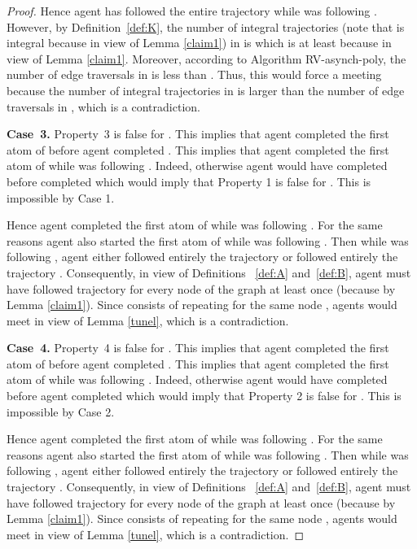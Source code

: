 \documentclass [11pt] {article}
\begin{document}
\begin{proof}
Hence agent  has followed the entire trajectory  while  was following . 
However, by Definition~\ref{def:K}, the number of integral trajectories  (note that  is integral because  in view of Lemma \ref{claim1}) in  is  which is at least  because  in view of Lemma \ref{claim1}. Moreover, according to Algorithm RV-asynch-poly, the number of {edge traversals} in  is less than . Thus, this would force a meeting because the number of integral trajectories  in  is larger than the number of {edge traversals} in , which is a contradiction.  



{\bf Case~3.} Property~3 is false for . This implies that agent  completed the first atom of   before agent  completed . This implies that agent  completed the first atom of   while  was following . Indeed, otherwise agent  would have completed  before  completed  which would imply that Property 1 is false for . This
is impossible by Case 1.

Hence agent  completed the first atom of  while  was following .  For the same reasons agent  also started the first atom of  while  was following .  Then while  was following ,  agent  either followed entirely the trajectory  or followed entirely the trajectory .  Consequently, in view of Definitions ~\ref{def:A} and~\ref{def:B}, agent  must have followed trajectory  for every node  of the graph at least once  (because  by Lemma \ref{claim1}). Since  consists of repeating  for the same node ,  agents would meet in view of Lemma \ref{tunel}, which is a contradiction.

{\bf Case~4.} Property~4 is false for . This implies that agent  completed the first atom of   before agent  completed 
. This implies that agent  completed the first atom of   while  was following . Indeed, otherwise agent  would have completed before agent  completed  which would imply that Property 2 is false for . This
is impossible by Case 2.

Hence agent  completed the first atom of  while  was following  . For the same reasons agent  also started the first atom of   while  was following .  Then while  was following
, agent  either followed entirely the trajectory  or followed entirely the trajectory .  Consequently,  in view of Definitions ~\ref{def:A} and~\ref{def:B},  agent  must have followed trajectory  for every node  of the graph at least once (because   by Lemma \ref{claim1}). Since  consists of repeating  for the same node ,  agents would meet in view of Lemma \ref{tunel}, which is a contradiction.
\end{proof}
\end{document}
